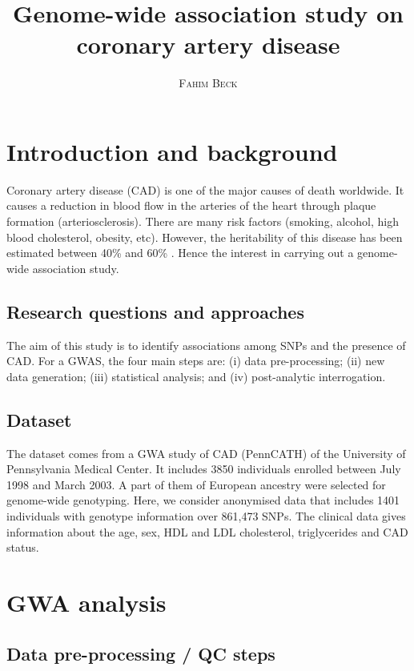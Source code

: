\documentclass[a4paper, 12pt]{article}
\title{Genome-wide association study on coronary artery disease \vspace{0.3cm}} %
\author{\smallskip
\large \textsc{Fahim Beck}}
\date{\vspace{-1.3cm}}
\begin{document}
\maketitle

\section{Introduction and background}

Coronary artery disease (CAD) is one of the major causes of death worldwide. It causes a reduction in blood flow in the arteries of the heart through plaque formation (arteriosclerosis). There are many risk factors (smoking, alcohol, high blood cholesterol, obesity, etc). However, the heritability of this disease has been estimated between 40\% and 60\% \citep{heredity}. Hence the interest in carrying out a genome-wide association study.  

\subsection{Research questions and approaches}

The aim of this study is to identify associations among SNPs and the presence of CAD. For a GWAS, the four main steps are: (i) data pre-processing; (ii) new data generation; (iii) statistical analysis; and (iv) post-analytic interrogation. 

\subsection{Dataset}

The dataset comes from a GWA study of CAD (PennCATH) of the University of Pennsylvania Medical Center. It includes 3850 individuals enrolled between July 1998 and March 2003. A part of them of European ancestry were selected for genome-wide genotyping. Here, we consider anonymised data that includes 1401 individuals with genotype information over 861,473 SNPs. The clinical data gives information about the age, sex, HDL and LDL cholesterol, triglycerides and CAD status. 

\section{GWA analysis}

\subsection{Data pre-processing / QC steps}
\end{document}
